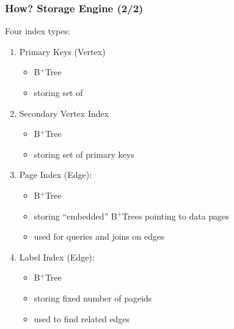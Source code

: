 \documentclass{beamer}
\begin{document}
\begin{frame}
\frametitle{How? Storage Engine (2/2)}
Four index types:
\begin{enumerate}
\item Primary Keys (Vertex)
      \begin{itemize}
      \item B$^+$Tree
      \item storing set of 
      \end{itemize}
\item Secondary Vertex Index
      \begin{itemize}
      \item B$^+$Tree
      \item storing set of primary keys
      \end{itemize}
\item Page Index (Edge):
      \begin{itemize}
      \item B$^+$Tree
      \item storing ``embedded'' B$^+$Trees
            pointing to data pages
      \item used for queries and joins on edges
      \end{itemize}
\item Label Index (Edge):
      \begin{itemize}
      \item B$^+$Tree
      \item storing fixed number of pageids
      \item used to find related edges
      \end{itemize}
\end{enumerate}
\end{frame}
\end{document}

